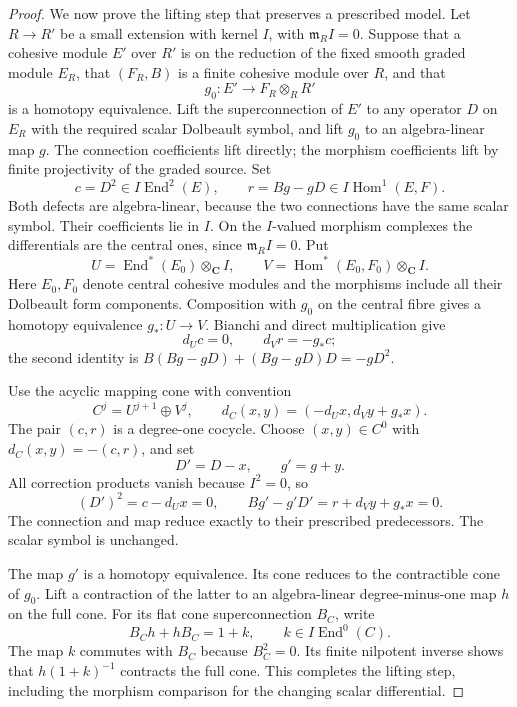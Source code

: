 \documentclass[11pt]{article}
\theoremstyle{definition}
\theoremstyle{remark}
\newcommand{\C}{\mathbf C}
\begin{document}
\begin{proof}
We now prove the lifting step that preserves a prescribed model.
Let $R\to R'$ be a small extension with kernel $I$, with
$\mathfrak m_R I=0$.  Suppose that a cohesive module $E'$ over
$R'$ is on the reduction of the fixed smooth graded module
$E_R$, that $(F_R,B)$ is a finite cohesive module over $R$,
and that
\[
 g_0:E'\longrightarrow F_R\otimes_R R'
\]
is a homotopy equivalence.  Lift the superconnection of $E'$
to any operator $D$ on $E_R$ with the required scalar
Dolbeault symbol, and lift $g_0$ to an algebra-linear map $g$.
The connection coefficients lift directly; the morphism
coefficients lift by finite projectivity of the graded source.
Set
\[
 c=D^2\in I\operatorname{End}^2(E),\qquad
 r=Bg-gD\in I\operatorname{Hom}^1(E,F).
\]
Both defects are algebra-linear, because the two connections
have the same scalar symbol.  Their coefficients lie in $I$.
On the $I$-valued morphism complexes the differentials are the
central ones, since $\mathfrak m_R I=0$.  Put
\[
 U=\operatorname{End}^*(E_0)\otimes_\C I,
 \qquad V=\operatorname{Hom}^*(E_0,F_0)\otimes_\C I.
\]
Here $E_0,F_0$ denote central cohesive modules and the morphisms
include all their Dolbeault form components.  Composition with
$g_0$ on the central fibre gives a homotopy equivalence
$g_*:U\to V$.  Bianchi and direct multiplication give
\[
 d_Uc=0,\qquad d_Vr=-g_*c;
\]
the second identity is
$B(Bg-gD)+(Bg-gD)D=-gD^2$.

Use the acyclic mapping cone with convention
\[
 C^j=U^{j+1}\oplus V^j,
 \qquad d_C(x,y)=(-d_Ux,d_Vy+g_*x).
\]
The pair $(c,r)$ is a degree-one cocycle.  Choose $(x,y)\in C^0$
with $d_C(x,y)=-(c,r)$, and set
\[
 D'=D-x,\qquad g'=g+y.
\]
All correction products vanish because $I^2=0$, so
\[
 (D')^2=c-d_Ux=0,\qquad
 Bg'-g'D'=r+d_Vy+g_*x=0.
\]
The connection and map reduce exactly to their prescribed
predecessors.  The scalar symbol is unchanged.

The map $g'$ is a homotopy equivalence.  Its cone reduces to
the contractible cone of $g_0$.  Lift a contraction of the latter
to an algebra-linear degree-minus-one map $h$ on the full cone.
For its flat cone superconnection $B_C$, write
\[
 B_Ch+hB_C=1+k,\qquad k\in I\operatorname{End}^0(C).
\]
The map $k$ commutes with $B_C$ because $B_C^2=0$.  Its finite
nilpotent inverse shows that $h(1+k)^{-1}$ contracts the full
cone.  This completes the lifting step, including the morphism
comparison for the changing scalar differential.


\end{proof}
\end{document}
